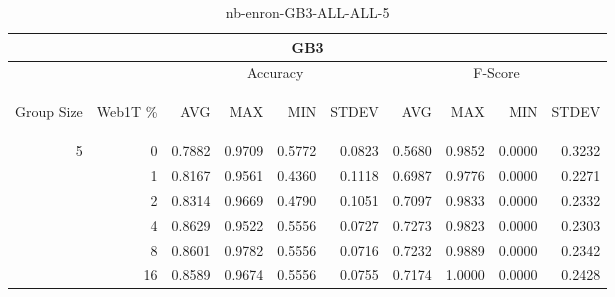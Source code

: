 \begin{center}
\begin{table}[htbp]
\begin{tabular}{ | r | r | r | r | r | r | r | r | r | r |}
\hline
\multicolumn{10}{|c|}{GB3}\\
\hline
 & & \multicolumn{4}{|c|}{Accuracy} & \multicolumn{4}{|c|}{F-Score}\\ \cline{3-10}
\begin{sideways}Group Size\end{sideways} & \begin{sideways}Web1T \%\end{sideways} & \begin{sideways}AVG\end{sideways} & \begin{sideways}MAX\end{sideways} & \begin{sideways}MIN\end{sideways} & \begin{sideways}STDEV\end{sideways} & \begin{sideways}AVG\end{sideways} & \begin{sideways}MAX\end{sideways} & \begin{sideways}MIN\end{sideways} & \begin{sideways}STDEV\end{sideways}\\
\hline
\multirow{6}{*}{5}
 & 0 & 0.7882 & 0.9709 & 0.5772 & 0.0823 & 0.5680 & 0.9852 & 0.0000 & 0.3232\\ \cline{2-10}
 & 1 & 0.8167 & 0.9561 & 0.4360 & 0.1118 & 0.6987 & 0.9776 & 0.0000 & 0.2271\\ \cline{2-10}
 & 2 & 0.8314 & 0.9669 & 0.4790 & 0.1051 & 0.7097 & 0.9833 & 0.0000 & 0.2332\\ \cline{2-10}
 & 4 & 0.8629 & 0.9522 & 0.5556 & 0.0727 & 0.7273 & 0.9823 & 0.0000 & 0.2303\\ \cline{2-10}
 & 8 & 0.8601 & 0.9782 & 0.5556 & 0.0716 & 0.7232 & 0.9889 & 0.0000 & 0.2342\\ \cline{2-10}
 & 16 & 0.8589 & 0.9674 & 0.5556 & 0.0755 & 0.7174 & 1.0000 & 0.0000 & 0.2428\\ \cline{2-10}
\hline
\end{tabular}
\caption{nb-enron-GB3-ALL-ALL-5}
\end{table}
\end{center}

